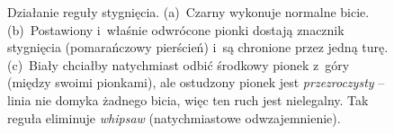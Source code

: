 \begin{figure}[H]\centering
\begin{subfigure}{0.31\textwidth}\centering
{}
\caption{}
\end{subfigure}\hfill
\begin{subfigure}{0.31\textwidth}\centering
{}
\caption{}
\end{subfigure}\hfill
\begin{subfigure}{0.31\textwidth}\centering
{}
\caption{}
\end{subfigure}
\caption{Działanie reguły stygnięcia. (a)~Czarny wykonuje normalne bicie. (b)~Postawiony i~właśnie
odwrócone pionki dostają znacznik stygnięcia (pomarańczowy pierścień) i~są chronione przez jedną
turę. (c)~Biały chciałby natychmiast odbić środkowy pionek z~góry (między swoimi pionkami), ale
ostudzony pionek jest \emph{przezroczysty} -- linia nie domyka żadnego bicia, więc ten ruch jest
nielegalny. Tak reguła eliminuje \emph{whipsaw} (natychmiastowe odwzajemnienie).}
\label{fig:cooldown}
\end{figure}
